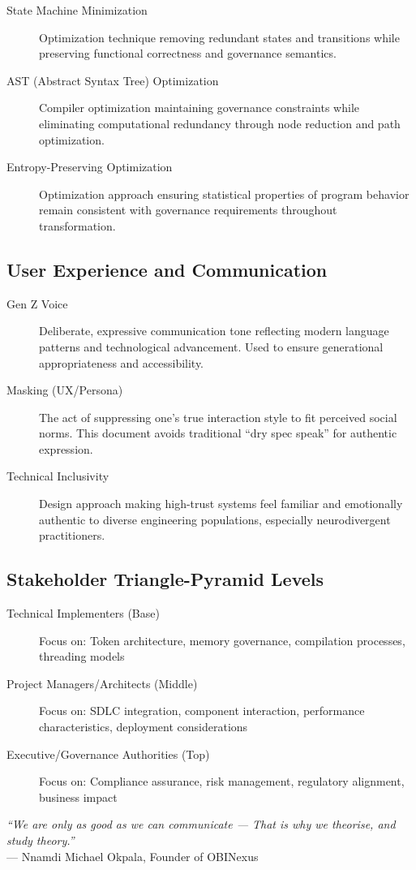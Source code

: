 \begin{description}
\item[State Machine Minimization] Optimization technique removing redundant states and transitions while preserving functional correctness and governance semantics.

\item[AST (Abstract Syntax Tree) Optimization] Compiler optimization maintaining governance constraints while eliminating computational redundancy through node reduction and path optimization.

\item[Entropy-Preserving Optimization] Optimization approach ensuring statistical properties of program behavior remain consistent with governance requirements throughout transformation.
\end{description}

\subsection*{User Experience and Communication}

\begin{description}
\item[Gen Z Voice] Deliberate, expressive communication tone reflecting modern language patterns and technological advancement. Used to ensure generational appropriateness and accessibility.

\item[Masking (UX/Persona)] The act of suppressing one's true interaction style to fit perceived social norms. This document avoids traditional ``dry spec speak'' for authentic expression.

\item[Technical Inclusivity] Design approach making high-trust systems feel familiar and emotionally authentic to diverse engineering populations, especially neurodivergent practitioners.
\end{description}

\subsection*{Stakeholder Triangle-Pyramid Levels}

\begin{description}
\item[Technical Implementers (Base)] Focus on: Token architecture, memory governance, compilation processes, threading models

\item[Project Managers/Architects (Middle)] Focus on: SDLC integration, component interaction, performance characteristics, deployment considerations

\item[Executive/Governance Authorities (Top)] Focus on: Compliance assurance, risk management, regulatory alignment, business impact
\end{description}

\vspace{1em}
\begin{center}
\textit{``We are only as good as we can communicate — That is why we theorise, and study theory.''}\\
--- Nnamdi Michael Okpala, Founder of OBINexus
\end{center}